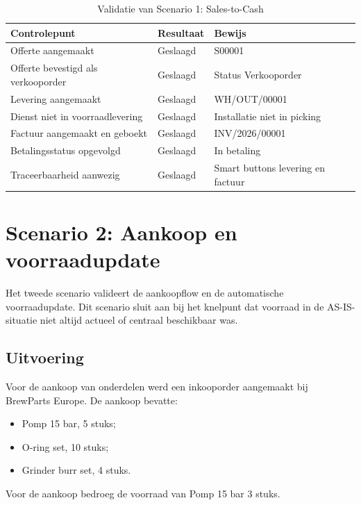 \begin{table}[H]
    \centering
    \caption{Validatie van Scenario 1: Sales-to-Cash}
    \label{tab:poc-s1}
    \begin{tabular}{p{}p{}p{}}
        \toprule
        \textbf{Controlepunt} & \textbf{Resultaat} & \textbf{Bewijs} \\
        \midrule
        Offerte aangemaakt & Geslaagd & S00001 \\
        Offerte bevestigd als verkooporder & Geslaagd & Status Verkooporder \\
        Levering aangemaakt & Geslaagd & WH/OUT/00001 \\
        Dienst niet in voorraadlevering & Geslaagd & Installatie niet in picking \\
        Factuur aangemaakt en geboekt & Geslaagd & INV/2026/00001 \\
        Betalingsstatus opgevolgd & Geslaagd & In betaling \\
        Traceerbaarheid aanwezig & Geslaagd & Smart buttons levering en factuur \\
        \bottomrule
    \end{tabular}
\end{table}

\section{Scenario 2: Aankoop en voorraadupdate}
\label{sec:poc-s2}

Het tweede scenario valideert de aankoopflow en de automatische voorraadupdate. Dit scenario sluit aan bij het knelpunt dat voorraad in de AS-IS-situatie niet altijd actueel of centraal beschikbaar was.

\subsection{Uitvoering}

Voor de aankoop van onderdelen werd een inkooporder aangemaakt bij BrewParts Europe. De aankoop bevatte:

\begin{itemize}
    \item Pomp 15 bar, 5 stuks;
    \item O-ring set, 10 stuks;
    \item Grinder burr set, 4 stuks.
\end{itemize}

Voor de aankoop bedroeg de voorraad van Pomp 15 bar 3 stuks.

